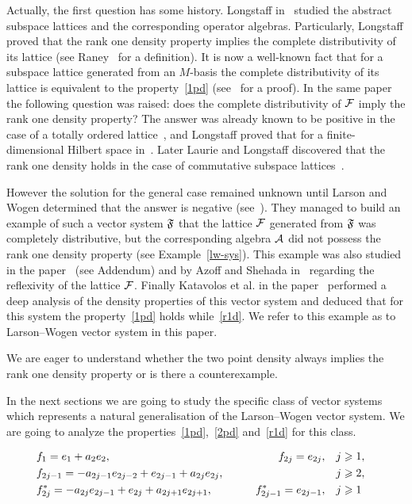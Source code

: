 \documentclass[12pt]{amsart}
\begin{document}
  Actually, the first question has some history.
  Longstaff in~\cite{longstaff} studied the abstract subspace lattices and the corresponding operator algebras.
  Particularly, Longstaff proved that the rank one density property implies
    the complete distributivity of its lattice (see Raney~\cite{raney} for a definition).
  It is now a well-known fact that for a subspace lattice generated from an $M$-basis the complete distributivity of its lattice is equivalent to
    the property~\ref{1pd} (see~\cite{argyroslambrou} for a proof).
  In the same paper the following question was raised: does the complete distributivity of $\cal{F}$ imply the rank one density property?
  The answer was already known to be positive in the case of a totally ordered lattice~\cite{erdos}, and
    Longstaff proved that for a finite-dimensional Hilbert space in~\cite{longstaff}.
  Later Laurie and Longstaff discovered that the rank one density holds in the case of commutative subspace lattices~\cite{laurielongstaff}.

  However the solution for the general case remained unknown until Larson and Wogen determined that the answer is negative (see~\cite{larson}).
  They managed to build an example of such a vector system $\fsys$ that the lattice $\cal{F}$ generated from $\fsys$
    was completely distributive, but the corresponding algebra $\cal{A}$
    did not possess the rank one density property (see Example~\ref{lw-sys}).
  This example was also studied in the paper~\cite{argyroslambrou} (see Addendum) and by Azoff and Shehada in~\cite{azoff} regarding
    the reflexivity of the lattice $\cal{F}$.
  Finally Katavolos et al. in the paper~\cite{katavolos} performed a deep analysis of the density properties of this vector system and
    deduced that for this system the property~\ref{1pd} holds while~\ref{r1d}.
  We refer to this example as to Larson--Wogen vector system in this paper.

  We are eager to understand whether the two point density always implies the rank one density property or is there a counterexample.

  In the next sections we are going to study the specific class of vector systems which represents a natural generalisation of
    the Larson--Wogen vector system.
  We are going to analyze the properties~\ref{1pd},~\ref{2pd} and~\ref{r1d} for this class.
  \begin{example}
    \label{lw-sys}
    \begin{align*}
      &f_1 = e_1 + a_2 e_2, \qquad &f_{2j}=e_{2j}, \quad&j \geq 1,&\\
      &f_{2j-1}=-a_{2j-1}e_{2j-2} + e_{2j-1} + a_{2j}e_{2j}, \qquad &\makebox[5em]{} \quad&j \geq 2,&\\
      &f^*_{2j}=-a_{2j}e_{2j-1}+e_{2j}+a_{2j+1}e_{2j+1}, \qquad &f^*_{2j-1}=e_{2j-1}, \quad&j \geq 1&
    \end{align*}
  \end{example}
\end{document}
